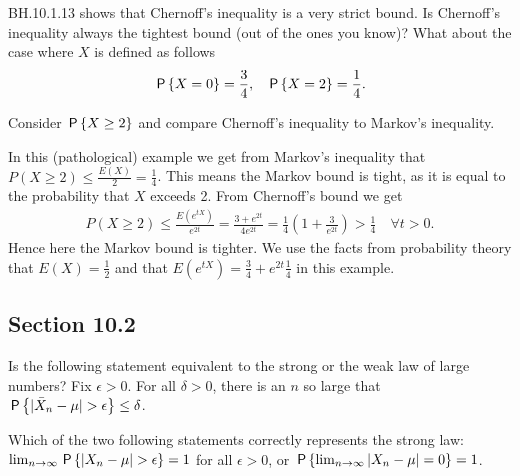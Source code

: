 \begin{exercise}
BH.10.1.13 shows that Chernoff's inequality is a very strict bound.
Is Chernoff's inequality always the tightest bound (out of the ones you know)?
What about the case where $X$ is defined as follows
\begin{align*}
    &\P{X=0} = \frac{3}{4}, & \P{X=2} = \frac{1}{4}.
\end{align*}

\begin{hint}
  Consider $\P{X\geq2}$ and compare Chernoff's inequality to Markov's inequality.
\end{hint}

\begin{solution}
In this (pathological) example we get from Markov's inequality that $P(X\geq 2) \leq \frac{E(X)}{2}=\frac{1}{4}$. This means the Markov bound is tight, as it is equal to the probability that $X$ exceeds 2. From Chernoff's bound we get
\begin{align*}
    P(X\geq 2)\leq \frac{E(e^{t  X})}{e^{2t}} = \frac{3+e^{2t}}{4 e^{2t}} = \frac{1}{4}\left(1+\frac{3}{e^{2t}}\right) > \frac{1}{4}\quad\forall t>0.
\end{align*} Hence here the Markov bound is tighter. We use the facts from probability theory that $E(X)=\frac12$ and that $E(e^{t X})=\frac34+e^{2 t}\frac14$ in this example.
\end{solution}
\end{exercise}




\subsection*{Section 10.2}
\label{sec:section-10.2}

\begin{exercise}
Is the following statement equivalent to the strong or the weak law of large numbers?
Fix $\epsilon>0$. For all $\delta>0$, there is an $n$ so large that $\P{|\bar X_n-\mu|>\epsilon} \leq \delta$.
\begin{hint}
\end{hint}
\begin{solution}
\end{solution}
\end{exercise}

\begin{exercise}
Which of the two following statements correctly represents the strong law: $\lim_{n\to\infty} \P{|X_n-\mu|>\epsilon} = 1$ for all $\epsilon>0$, or $\P{\lim_{n\to\infty} |X_n-\mu|=0} = 1$.
\begin{hint}
\end{hint}
\begin{solution}
\end{solution}
\end{exercise}

